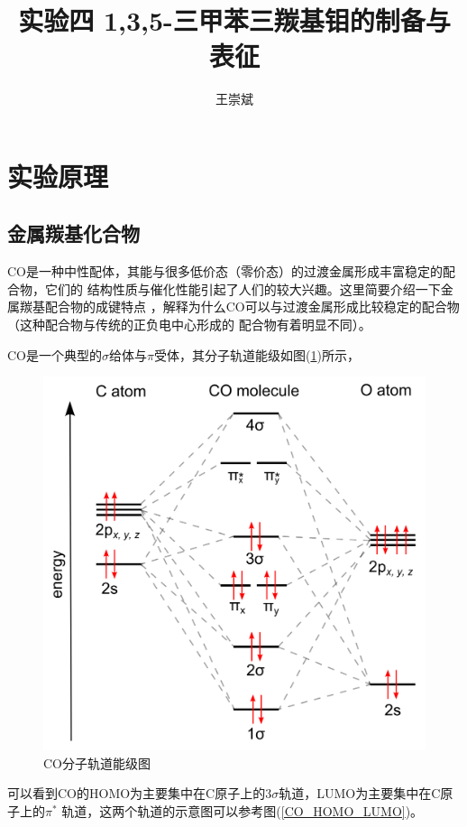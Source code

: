 \documentclass[a4paper,zihao=5,UTF8]{ctexart}
\title{\textbf{实验四 1,3,5-三甲苯三羰基钼的制备与表征\cite{inorganic_chemistry_1}}}
\author{王崇斌\;1800011716}
\begin{document}
	\pagestyle{fancy}
	\pagestyle{fancy}
	\chead{}
	\rhead{\today}
	\maketitle
    \thispagestyle{fancy}
	\section{实验原理}
	\subsection{金属羰基化合物}
	CO是一种中性配体，其能与很多低价态（零价态）的过渡金属形成丰富稳定的配合物，它们的
	结构性质与催化性能引起了人们的较大兴趣。这里简要介绍一下金属羰基配合物的成键特点
	，解释为什么CO可以与过渡金属形成比较稳定的配合物（这种配合物与传统的正负电中心形成的
	配合物有着明显不同）。
	\par 
	CO是一个典型的$\sigma$给体与$\pi$受体，其分子轨道能级如图(\ref{CO_MO})所示，
	\begin{figure}[htbp]
		\centering
		\includegraphics[scale=0.2]{MO_CO.png}
		\caption{CO分子轨道能级图}
		\label{CO_MO}
	\end{figure}
	可以看到CO的HOMO为主要集中在C原子上的$3\sigma$轨道，LUMO为主要集中在C原子上的$\pi^*$
	轨道，这两个轨道的示意图可以参考图(\ref{CO_HOMO_LUMO})。
\end{document}
